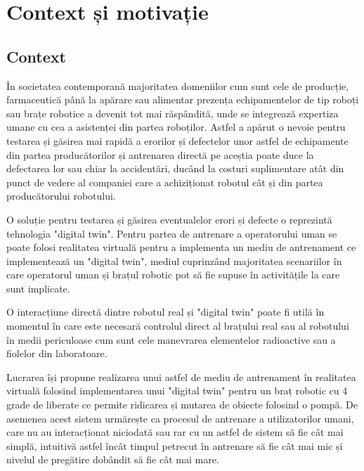\clearpage




 \setcounter{page}{4}
\section{Context și motivație}

\subsection{Context}

În societatea contemporană majoritatea domeniilor cum sunt cele de producție, farmaceutică până la apărare sau alimentar prezența echipamentelor de tip roboți sau brațe robotice a devenit tot mai răspândită, unde se  integrează expertiza umane cu cea a asistenței din partea roboților. Astfel a apărut o nevoie pentru testarea și găsirea mai rapidă a erorilor și defectelor unor astfel de echipamente din partea producătorilor și antrenarea directă pe aceștia poate duce la defectarea lor sau chiar la accidentări, ducând la costuri suplimentare atât din punct de vedere al companiei care a achiziționat robotul cât și din partea producătorului robotului.

O soluție pentru testarea și găsirea eventualelor erori și defecte o reprezintă tehnologia "digital twin". Pentru partea de antrenare a operatorului uman se poate folosi realitatea virtuală pentru a implementa un mediu de antrenament ce implementează un "digital twin", mediul cuprinzând majoritatea scenariilor în care operatorul uman și brațul robotic pot să fie supuse în activitățile la care sunt implicate.


O interacțiune directă dintre robotul real și "digital twin" poate fi utilă în momentul în care este necesară controlul direct al brațului real sau al robotului în medii periculoase cum sunt cele manevrarea elementelor radioactive sau a fiolelor din laboratoare.

Lucrarea își propune realizarea unui astfel de mediu de antrenament în realitatea virtuală folosind implementarea unui  "digital twin"  pentru un braț robotic cu 4 grade de liberate ce permite ridicarea și mutarea de obiecte folosind o pompă. De asemenea acest sistem urmărește ca procesul de antrenare a utilizatorilor umani, care nu au interacționat niciodată sau rar cu un astfel de sistem să fie cât mai simplă, intuitivă astfel încât timpul petrecut în antrenare să fie cât mai mic și nivelul de pregătire dobândit să fie cât mai mare.



